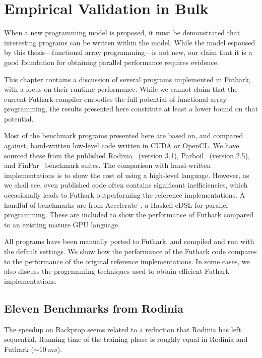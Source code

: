 \chapter{Empirical Validation in Bulk}
\label{chap:empirical-validation}

When a new programming model is proposed, it must be demonstrated that
interesting programs can be written within the model.  While the model
espoused by this thesis---functional array programming---is not new,
our claim that it is a good foundation for obtaining parallel
performance requires evidence.

This chapter contains a discussion of several programs implemented in
Futhark, with a focus on their runtime performance.  While we cannot
claim that the current Futhark compiler embodies the full potential of
functional array programming, the results presented here constitute at
least a lower bound on that potential.

Most of the benchmark programs presented here are based on, and
compared against, hand-written low-level code written in CUDA or
OpenCL.  We have sourced these from the published
Rodinia~\cite{5306797} (version 3.1),
Parboil~\cite{stratton2012parboil} (version 2.5), and
FinPar~\cite{FinPar:TACO} benchmark suites.  The comparison with
hand-written implementations is to show the cost of using a high-level
language.  However, as we shall see, even published code often
contains significant inefficiencies, which occasionally leads to
Futhark outperforming the reference implementations.  A handful of
benchmarks are from Accelerate~\cite{mcdonell2013optimising}, a
Haskell eDSL for parallel programming.  These are included to show the
performance of Futhark compared to an existing mature GPU language.

All programs have been manually ported to Futhark, and compiled and
run with the default settings.  We show how the performance of the
Futhark code compares to the performance of the original reference
implementations.  In some cases, we also discuss the programming
techniques used to obtain efficient Futhark implementations.

\section{Eleven Benchmarks from Rodinia}
\label{sec:rodinia}

The speedup on Backprop seems related to a reduction that Rodinia has
left sequential.  Running time of the training phase is roughly equal
in Rodinia and Futhark ($\sim10~ms$).

